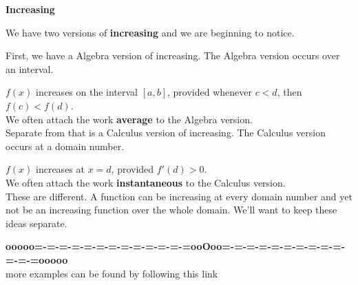 \documentclass{ximera}
\begin{document}
\begin{warning} \textbf{\textcolor{red!80!black}{Increasing}}



We have two versions of \textbf{increasing} and we are beginning to notice.



First, we have a Algebra version of increasing.  The Algebra version occurs over an interval.  

$f(x)$ increases on the interval $[a,b]$, provided whenever $c < d$, then $f(c) < f(d)$. \\

We often attach the work \textbf{average} to the Algebra version.\\







Separate from that is a Calculus version of increasing. The Calculus version occurs at a domain number.

$f(x)$ increases at $x=d$, provided $f'(d) > 0$. \\

We often attach the work \textbf{instantaneous} to the Calculus version.\\




These are different.  A function can be increasing at every domain number and yet not be an increasing function over the whole domain.  We'll want to keep these ideas separate.





\end{warning}









\begin{center}
\textbf{\textcolor{green!50!black}{ooooo=-=-=-=-=-=-=-=-=-=-=-=-=ooOoo=-=-=-=-=-=-=-=-=-=-=-=-=ooooo}} \\

more examples can be found by following this link\\ 

\end{center}
\end{document}
